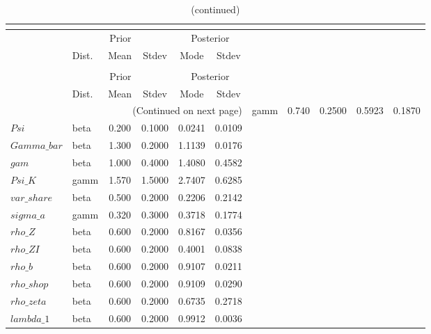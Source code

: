  
\begin{center}
\begin{longtable}{llcccc} 
\caption{Results from posterior maximization (parameters)}\\
 \label{Table:Posterior:1}\\
\toprule 
  & \multicolumn{3}{c}{Prior}  &  \multicolumn{2}{c}{Posterior} \\
  \cmidrule(r{.75em}){2-4} \cmidrule(r{.75em}){5-6}
  & Dist. & Mean  & Stdev & Mode & Stdev \\ 
\midrule \endfirsthead 
\caption{(continued)}\\
 \bottomrule 
  & \multicolumn{3}{c}{Prior}  &  \multicolumn{2}{c}{Posterior} \\
  \cmidrule(r{.75em}){2-4} \cmidrule(r{.75em}){5-6}
  & Dist. & Mean  & Stdev & Mode & Stdev \\ 
\midrule \endhead 
\bottomrule \multicolumn{6}{r}{(Continued on next page)}\endfoot 
\bottomrule\endlastfoot 
$psi\_inv$ & gamm &   0.740 & 0.2500 &   0.5923 &  0.1870 \\ 
$Psi$ & beta &   0.200 & 0.1000 &   0.0241 &  0.0109 \\ 
$Gamma\_bar$ & beta &   1.300 & 0.2000 &   1.1139 &  0.0176 \\ 
$gam$ & beta &   1.000 & 0.4000 &   1.4080 &  0.4582 \\ 
$Psi\_K$ & gamm &   1.570 & 1.5000 &   2.7407 &  0.6285 \\ 
$var\_share$ & beta &   0.500 & 0.2000 &   0.2206 &  0.2142 \\ 
$sigma\_a$ & gamm &   0.320 & 0.3000 &   0.3718 &  0.1774 \\ 
$rho\_Z$ & beta &   0.600 & 0.2000 &   0.8167 &  0.0356 \\ 
$rho\_ZI$ & beta &   0.600 & 0.2000 &   0.4001 &  0.0838 \\ 
$rho\_b$ & beta &   0.600 & 0.2000 &   0.9107 &  0.0211 \\ 
$rho\_shop$ & beta &   0.600 & 0.2000 &   0.9109 &  0.0290 \\ 
$rho\_zeta$ & beta &   0.600 & 0.2000 &   0.6735 &  0.2718 \\ 
$lambda\_1$ & beta &   0.600 & 0.2000 &   0.9912 &  0.0036 \\ 
\end{longtable}
 \end{center}
